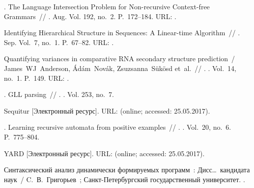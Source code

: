 \begin{thebibliography}{10}
. The Language Intersection Problem
  for Non-recursive Context-free Grammars~//
  \href{http://dx.doi.org/10.1016/j.ic.2004.03.004}{}
  \BibDash
{}. \BibDash Aug. \BibDash
\newblock Vol. 192, no.~2. \BibDash
\newblock P.~172--184. \BibDash
\newblock URL: .

 Identifying Hierarchical
  Structure in Sequences: A Linear-time Algorithm~//  \BibDash
{}. \BibDash Sep. \BibDash
\newblock Vol.~7, no.~1. \BibDash
\newblock P.~67--82. \BibDash
\newblock URL: .

Quantifying variances in comparative RNA secondary structure prediction~/
  James~WJ~Anderson, {\'A}d{\'a}m~Nov{\'a}k, Zsuzsanna~S{\"u}k{\"o}sd et~al.~//
  \href{http://dx.doi.org/10.1186/1471-2105-14-149}{}. \BibDash
{}. \BibDash
\newblock Vol.~14, no.~1. \BibDash
\newblock P.~149. \BibDash
\newblock URL: .

. GLL parsing~//
  \href{http://dx.doi.org/10.1016/j.entcs.2010.08.041}{}. \BibDash
{}. \BibDash
\newblock Vol. 253, no.~7.

Sequitur [Электронный ресурс]. \BibDash
\newblock URL:  (online; accessed:
  25.05.2017).

. Learning recursive automata from positive
  examples~// . \BibDash
{}. \BibDash
\newblock Vol.~20, no.~6. \BibDash
\newblock P.~775--804.

YARD [Электронный ресурс]. \BibDash
\newblock URL:
   (online;
  accessed: 25.05.2017).

 Синтаксический анализ
  динамически формируемых программ~:
  {Дисс\ldots\ кандидата наук}~/ C.~В.~Григорьев~;
  Санкт-Петербургский государственный
  университет. \BibDash
{}.

\end{thebibliography}



